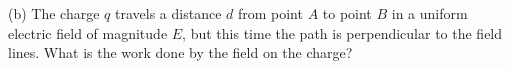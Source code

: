 \vspace{0.3cm}
{\centering {} \par}
\answerspace{0.3cm}

(b) The charge $q$ travels a distance $d$ from point $A$ to point $B$ in a
uniform electric field of magnitude $E$, but this time the path is perpendicular
to the field lines. What is the work done by the field on the charge?

\vspace{0.3cm}
{\centering {} \par}
\answerspace{0.3cm}

